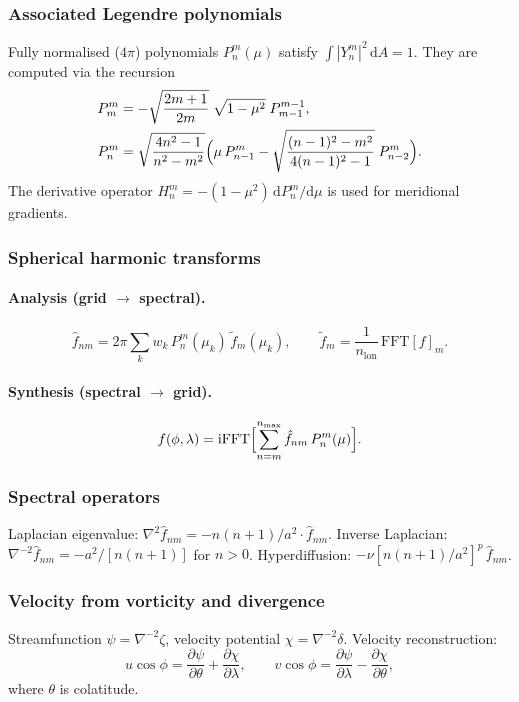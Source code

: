 \documentclass[11pt,a4paper]{article}
\newcommand{\dd}{\mathrm{d}}
\newcommand{\pp}{\partial}
\begin{document}
\subsubsection{Associated Legendre polynomials}
Fully normalised ($4\pi$) polynomials $P_n^m(\mu)$ satisfy $\int|Y_n^m|^2\,\dd A=1$.  They are computed via the recursion
\begin{align}
  P_m^m &= -\sqrt{\frac{2m+1}{2m}}\;\sqrt{1-\mu^2}\;P_{m-1}^{m-1},\\
  P_n^m &= \sqrt{\frac{4n^2-1}{n^2-m^2}}\Bigl(\mu\,P_{n-1}^m - \sqrt{\frac{(n-1)^2-m^2}{4(n-1)^2-1}}\;P_{n-2}^m\Bigr).
\end{align}
The derivative operator $H_n^m=-(1-\mu^2)\,\dd P_n^m/\dd\mu$ is used for meridional gradients.

\subsubsection{Spherical harmonic transforms}
\paragraph{Analysis (grid $\to$ spectral).}
\begin{equation}
  \hat f_{nm} = 2\pi\sum_k w_k\,P_n^m(\mu_k)\,\tilde f_m(\mu_k),
  \qquad \tilde f_m = \frac{1}{n_{\mathrm{lon}}}\,\mathrm{FFT}[f]_m.
\end{equation}

\paragraph{Synthesis (spectral $\to$ grid).}
\begin{equation}
  f(\phi,\lambda) = \mathrm{iFFT}\Bigl[\sum_{n=m}^{n_{\max}}\hat f_{nm}\,P_n^m(\mu)\Bigr].
\end{equation}

\subsubsection{Spectral operators}
Laplacian eigenvalue: $\nabla^2\hat f_{nm}=-n(n+1)/a^2\cdot\hat f_{nm}$.  Inverse Laplacian: $\nabla^{-2}\hat f_{nm}=-a^2/[n(n+1)]$ for $n>0$.  Hyperdiffusion: $-\nu[n(n+1)/a^2]^p\,\hat f_{nm}$.

\subsubsection{Velocity from vorticity and divergence}
Streamfunction $\psi=\nabla^{-2}\zeta$, velocity potential $\chi=\nabla^{-2}\delta$.  Velocity reconstruction:
\begin{equation}
  u\cos\phi = \frac{\pp\psi}{\pp\theta}+\frac{\pp\chi}{\pp\lambda},
  \qquad
  v\cos\phi = \frac{\pp\psi}{\pp\lambda}-\frac{\pp\chi}{\pp\theta},
\end{equation}
where $\theta$ is colatitude.
\end{document}
